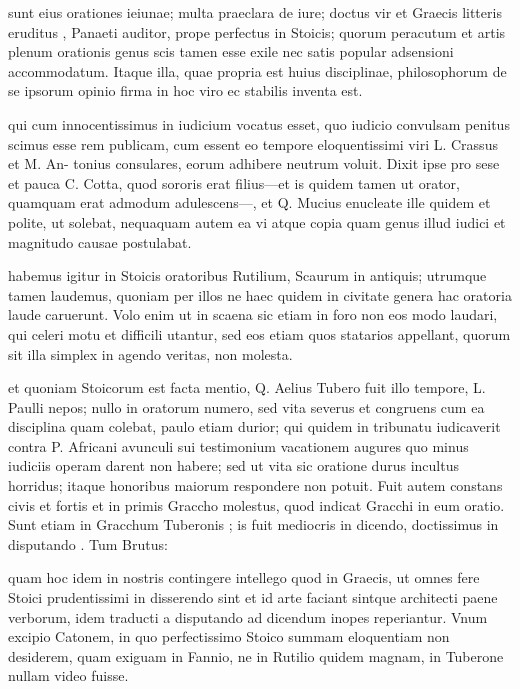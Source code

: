  sunt eius orationes ieiunae; multa praeclara de iure; doctus vir et Graecis litteris eruditus , Panaeti auditor, prope perfectus in Stoicis; quorum peracutum et artis plenum orationis genus scis tamen esse exile nec satis popular adsensioni accommodatum. Itaque illa, quae propria est huius disciplinae, philosophorum de se ipsorum opinio firma in hoc viro ec stabilis inventa est.

 qui cum innocentissimus in iudicium vocatus esset, quo iudicio convulsam penitus scimus esse rem publicam, cum essent eo tempore eloquentissimi viri L. Crassus et M. An- tonius consulares, eorum adhibere neutrum voluit. Dixit ipse pro sese et pauca C. Cotta, quod sororis erat filius—et is quidem tamen ut orator, quamquam erat admodum adulescens—, et Q. Mucius enucleate ille quidem et polite, ut solebat, nequaquam autem ea vi atque copia quam genus illud iudici et magnitudo causae postulabat.

 habemus igitur in Stoicis oratoribus Rutilium, Scaurum in antiquis; utrumque tamen laudemus, quoniam per illos ne haec quidem in civitate genera hac oratoria laude caruerunt. Volo enim ut in scaena sic etiam in foro non eos modo laudari, qui celeri motu et difficili utantur, sed eos etiam quos statarios appellant, quorum sit illa simplex in agendo veritas, non molesta.

 et quoniam Stoicorum est facta mentio, Q. Aelius Tubero fuit illo tempore, L. Paulli nepos; nullo in oratorum numero, sed vita severus et congruens cum ea disciplina quam colebat, paulo etiam durior; qui quidem in tribunatu iudicaverit contra P. Africani avunculi sui testimonium vacationem augures quo minus iudiciis operam darent non habere; sed ut vita sic oratione durus incultus horridus; itaque honoribus maiorum respondere non potuit. Fuit autem constans civis et fortis et in primis Graccho molestus, quod indicat Gracchi in eum oratio. Sunt etiam in Gracchum Tuberonis ; is fuit mediocris in dicendo, doctissimus in disputando . Tum Brutus:

 quam hoc idem in nostris contingere intellego quod in Graecis, ut omnes fere Stoici prudentissimi in disserendo sint et id arte faciant sintque architecti paene verborum, idem traducti a disputando ad dicendum inopes reperiantur. Vnum excipio Catonem, in quo perfectissimo Stoico summam eloquentiam non desiderem, quam exiguam in Fannio, ne in Rutilio quidem magnam, in Tuberone nullam video fuisse.

